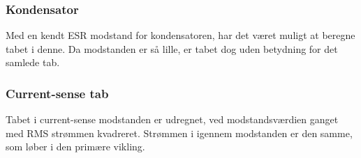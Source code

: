 \subsubsection{Kondensator}
\noindent Med en kendt ESR modstand for kondensatoren, har det været muligt at beregne tabet i denne. Da modstanden er så lille, er tabet dog uden betydning for det samlede tab.

\subsubsection{Current-sense tab}
\noindent Tabet i current-sense modstanden er udregnet, ved modstandsværdien ganget med RMS strømmen kvadreret. Strømmen i igennem modstanden er den samme, som løber i den primære vikling. 